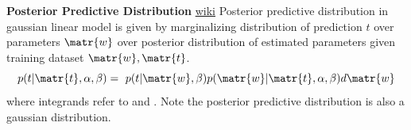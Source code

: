 \documentclass[11pt]{article}
\begin{document}


\begin{defn*}
    \textbf{Posterior Predictive Distribution} \href{https://en.wikipedia.org/wiki/Posterior_predictive_distribution}{wiki} Posterior predictive distribution in gaussian linear model is given by marginalizing distribution of prediction $t$ over parameters $\matr{w}$ over posterior distribution of estimated parameters given training dataset $\matr{w}, \matr{t}$.
    \[
        p(t|\matr{t}, \alpha,\beta) = \
        p(t|\matr{w},\beta) p(\matr{w}|\matr{t}, \alpha, \beta) d\matr{w}
    \]
    where integrands refer to  and . Note the posterior predictive distribution is also a gaussian distribution.
\end{defn*}



\end{document}

